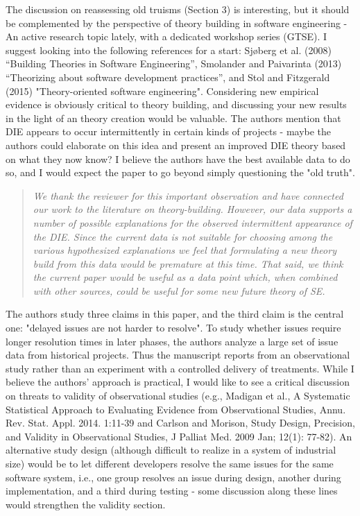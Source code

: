 \documentclass[smallcondensed]{svjour3}
\begin{document}
The discussion on reassessing old truisms (Section 3) is
interesting, but it should be complemented by the
perspective of theory building in software engineering - An
active research topic lately, with a dedicated workshop
series (GTSE). I suggest looking into the following
references for a start: Sj{\o}berg et al. (2008) ``Building
Theories in Software Engineering'', Smolander and Paivarinta
(2013) ``Theorizing about software development practices'',
and Stol and Fitzgerald (2015) "Theory-oriented software
engineering". Considering new empirical evidence is
obviously critical to theory building, and discussing your
new results in the light of an theory creation would be
valuable. The authors mention that DIE appears to occur
intermittently in certain kinds of projects - maybe the
authors could elaborate on this idea and present an improved
DIE theory based on what they now know? I believe the
authors have the best available data to do so, and I would
expect the paper to go beyond simply questioning the "old
truth". 
 
 \begin{quote}{\em 
We thank the reviewer for this important observation and have connected our work to the literature on theory-building. However, our data supports a number of possible explanations for the observed intermittent appearance of the DIE. Since the current data is not suitable for choosing among the various hypothesized explanations we feel that formulating a new theory build from this data
would be premature at this time. That said, we think the current paper would be useful
as a data point which, when combined with other sources, could be useful for some new future theory of SE.
}\end{quote}

The authors study three claims in this paper, and the
third claim is the central one: "delayed issues are not
harder to resolve". To study whether issues require longer
resolution times in later phases, the authors analyze a
large set of issue data from historical projects. Thus the
manuscript reports from an observational study rather than
an experiment with a controlled delivery of treatments.
While I believe the authors' approach is practical, I would
like to see a critical discussion on threats to validity of
observational studies (e.g., Madigan et al., A Systematic
Statistical Approach to Evaluating Evidence from
Observational Studies, Annu. Rev. Stat. Appl. 2014. 1:11-39
and Carlson and Morison, Study Design, Precision, and
Validity in Observational Studies, J Palliat Med. 2009 Jan;
12(1): 77-82). An alternative study design (although
difficult to realize in a system of industrial size) would
be to let different developers resolve the same issues for
the same software system, i.e., one group resolves an issue
during design, another during implementation, and a third
during testing - some discussion along these lines would
strengthen the validity section. 
\end{document}
